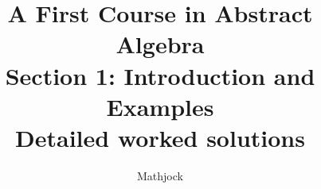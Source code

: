 
\title{\textbf{A First Course in Abstract Algebra}\\[0.3em]Section 1: Introduction and Examples\\[0.3em]\large Detailed worked solutions}
\author{Mathjock}
\date{}

\maketitle
\bookinfo
\tableofcontents
\clearpage
\renewcommand{\thesection}{1}
\renewcommand{\theHsection}{fraleigh.1}


